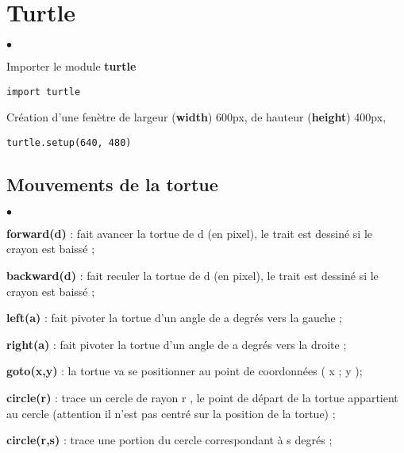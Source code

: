\documentclass[10pt,dvipsnames,  dvips]{article}
\begin{document}
\newpage
\section{Turtle}

\begin{list}{$\bullet$}{}
\item Importer le module \textbf{turtle}  
\begin{lstlisting}
import turtle
\end{lstlisting}
\item Création d'une fenètre de largeur  (\textbf{width})  600px, de hauteur (\textbf{height}) 400px, \\
\begin{lstlisting}
turtle.setup(640, 480) 
\end{lstlisting}
\end{list}

\begin{center}
\end{center}

\subsection{ Mouvements de la tortue}

\begin{list}{$\bullet$}{}
\item  \textbf{forward(d)} : fait avancer la tortue de d (en pixel), le trait est dessiné si le crayon est baissé ;
\item  \textbf{backward(d)} : fait reculer la tortue de d (en pixel), le trait est dessiné si le crayon est baissé ;
\item  \textbf{left(a)} : fait pivoter la tortue d’un angle de a degrés vers la gauche ;
\item  \textbf{right(a)} : fait pivoter la tortue d’un angle de a degrés vers la droite ;
\item  \textbf{goto(x,y)} : la tortue va se positionner au point de coordonnées ( x ; y );
\item  \textbf{circle(r)} : trace un cercle de rayon r , le point de départ de la tortue appartient au cercle (attention il n’est
pas centré sur la position de la tortue) ;
\item  \textbf{circle(r,s)} : trace une portion du cercle correspondant à s degrés ;
\end{list}
\end{document}

